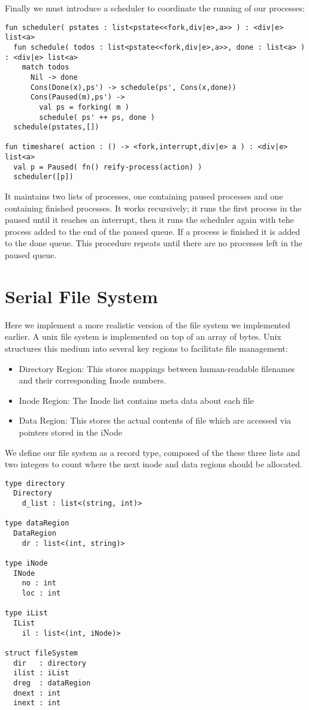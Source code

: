 \documentclass[logo,bsc,singlespacing,parskip]{infthesis}
\begin{document}
Finally we must introduce a scheduler to coordinate the running of our processes: 
\begin{lstlisting}
fun scheduler( pstates : list<pstate<<fork,div|e>,a>> ) : <div|e> list<a>
  fun schedule( todos : list<pstate<<fork,div|e>,a>>, done : list<a> ) : <div|e> list<a>
    match todos
      Nil -> done
      Cons(Done(x),ps') -> schedule(ps', Cons(x,done))
      Cons(Paused(m),ps') ->
        val ps = forking( m )
        schedule( ps' ++ ps, done )
  schedule(pstates,[])

fun timeshare( action : () -> <fork,interrupt,div|e> a ) : <div|e> list<a>
  val p = Paused( fn() reify-process(action) )
  scheduler([p])
\end{lstlisting}
It maintains two lists of processes, one containing paused processes and one containing finished processes. It works recursively; it runs the first process in the paused until it reaches an interrupt, then it runs the scheduler again with tehe process added to the end of the paused queue. If a process is finished it is added to the done queue. This procedure repeats until there are no processes left in the paused queue.

\section{Serial File System}
Here we implement a more realistic version of the file system we implemented earlier. A unix file system is implemented on top of an array of bytes. Unix structures this medium into several key regions to facilitate file management:
\begin{itemize}
    \item Directory Region: This stores mappings between human-readable filenames and their corresponding Inode numbers.
    \item Inode Region: The Inode list contains meta data about each file
    \item Data Region: This stores the actual contents of file which are accessed via pointers stored in the iNode
\end{itemize}

We define our file system as a record type, composed of the these three lists and two integers to count where the next inode and data regions should be allocated.

\begin{lstlisting}
type directory 
  Directory
    d_list : list<(string, int)>

type dataRegion 
  DataRegion
    dr : list<(int, string)>

type iNode
  INode
    no : int
    loc : int

type iList 
  IList
    il : list<(int, iNode)> 

struct fileSystem
  dir   : directory
  ilist : iList
  dreg  : dataRegion
  dnext : int
  inext : int

\end{lstlisting}
\end{document}
